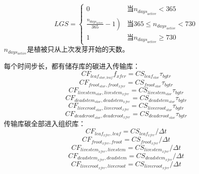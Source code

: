 \begin{equation}
L G S=\left\{\begin{array}{cc}0 &  { 当 } n_{ {days }_{active}}<365 \\ \left.\frac{n_{ {days_{active}}}}{365}-1\right) &  { 当 } 365 \leq n_{ {days }_{active} }<730 \\ 1 &  { 当 } n_{ {days}_{active}} \geq 730\end{array}\right.
\end{equation}
$n_{days_{active}}$是植被只从上次发芽开始的天数。


每个时间步长，都有储存库的碳进入传输库：
\begin{equation}
CF_{leaf_{stor,leaf}} f_{xfer}=CS_{leaf_{stor} } \tau_{bgtr}
\end{equation}
\begin{equation}
CF_{ {froot }_{stor},{ froot }_{xfer }}=CS_{{froot }_{stor}} \tau_{bgtr}
\end{equation}
\begin{equation}
  CF_{livestem_{stor},livestem_{xfer}}=CS_{livestem_{stor}}\tau_{bgtr}
\end{equation}
\begin{equation}
  CF_{deadstem_{stor},deadstem_{xfer}}=CS_{deadstem_{stor}}\tau_{bgtr}
\end{equation}
\begin{equation}
  CF_{livecroot_{stor},livecroot_{xfer}}=CS_{livecroot_{stor}}\tau_{bgtr}
\end{equation}
\begin{equation}
  CF_{deadcroot_{stor},deadcroot_{xfer}}=CS_{deadcroot_{stor}}\tau_{bgtr}
\end{equation}
传输库碳全部进入组织库：
\begin{equation}
  CF_{leaf_{xfer},leaf}=CS_{leaf_{xfer}}/\Delta t
\end{equation}
\begin{equation}
  CF_{froot_{xfer},froot}=CS_{froot_{xfer}}/\Delta t
\end{equation}
\begin{equation}
  CF_{livestem_{xfer},livestem}=CS_{livestem_{xfer}}/\Delta t
\end{equation}
\begin{equation}
  CF_{deadstem_{xfer},deadstem}=CS_{deadstem_{xfer}}/\Delta t
\end{equation}
\begin{equation}
  CF_{livecroot_{xfer},livecroot}=CS_{livecroot_{xfer}}/\Delta t
\end{equation}
